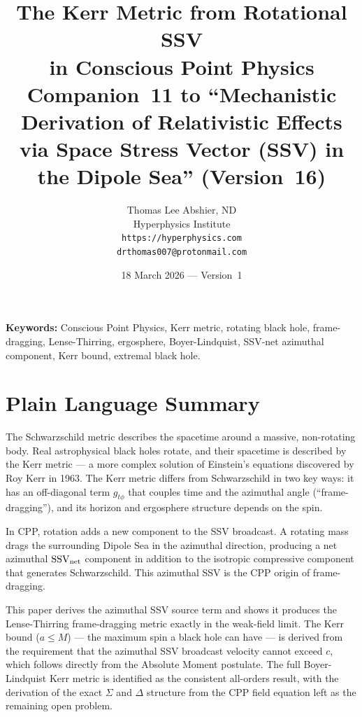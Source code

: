 \documentclass[12pt]{article}
\title{\textbf{The Kerr Metric from Rotational SSV\\
in Conscious Point Physics}\\[6pt]
{\large Companion~11 to ``Mechanistic Derivation of Relativistic Effects\\
via Space Stress Vector (SSV) in the Dipole Sea'' (Version~16)}}
\author{Thomas Lee Abshier, ND\\
Hyperphysics Institute\\
\texttt{https://hyperphysics.com}\\
\texttt{drthomas007@protonmail.com}}
\date{18 March 2026 --- Version~1}
\newcommand{\SSV}{\mathrm{SSV}}
\begin{document}
\maketitle

\noindent\textbf{Keywords:} Conscious Point Physics, Kerr metric,
rotating black hole, frame-dragging, Lense-Thirring, ergosphere,
Boyer-Lindquist, SSV-net azimuthal component, Kerr bound, extremal
black hole.

\section*{Plain Language Summary}

The Schwarzschild metric describes the spacetime around a massive,
non-rotating body.  Real astrophysical black holes rotate, and their
spacetime is described by the Kerr metric — a more complex solution
of Einstein's equations discovered by Roy Kerr in 1963.  The Kerr
metric differs from Schwarzschild in two key ways: it has an
off-diagonal term $g_{t\phi}$ that couples time and the azimuthal
angle (``frame-dragging''), and its horizon and ergosphere structure
depends on the spin.

In CPP, rotation adds a new component to the SSV broadcast.  A
rotating mass drags the surrounding Dipole Sea in the azimuthal
direction, producing a net azimuthal $\SSV_{\rm net}$ component in
addition to the isotropic compressive component that generates
Schwarzschild.  This azimuthal SSV is the CPP origin of frame-dragging.

This paper derives the azimuthal SSV source term and shows it produces
the Lense-Thirring frame-dragging metric exactly in the weak-field
limit.  The Kerr bound ($a \leq M$) — the maximum spin a black hole
can have — is derived from the requirement that the azimuthal SSV
broadcast velocity cannot exceed $c$, which follows directly from the
Absolute Moment postulate.  The full Boyer-Lindquist Kerr metric is
identified as the consistent all-orders result, with the derivation of
the exact $\Sigma$ and $\Delta$ structure from the CPP field equation
left as the remaining open problem.
\end{document}

